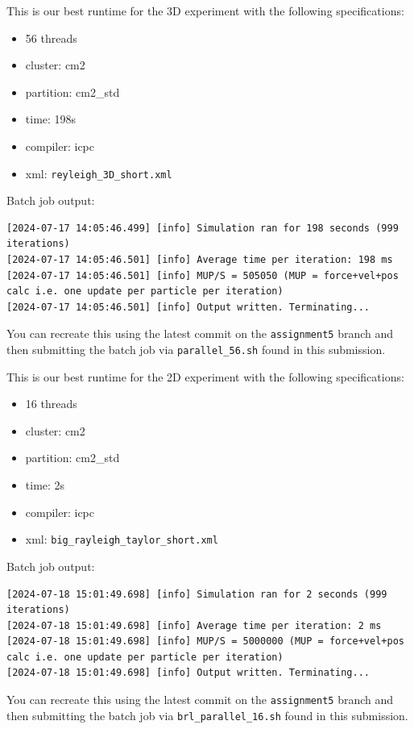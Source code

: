 \documentclass{article}
\begin{document}
\bigskip
This is our best runtime for the 3D experiment with the following specifications:

\begin{itemize}
    \item 56 threads 
    \item cluster: cm2
    \item partition: cm2\_std
    \item time: 198s
    \item compiler: icpc
    \item xml: \texttt{reyleigh\_3D\_short.xml}
\end{itemize}

Batch job output:
\begin{lstlisting}
[2024-07-17 14:05:46.499] [info] Simulation ran for 198 seconds (999 iterations)
[2024-07-17 14:05:46.501] [info] Average time per iteration: 198 ms
[2024-07-17 14:05:46.501] [info] MUP/S = 505050 (MUP = force+vel+pos calc i.e. one update per particle per iteration)
[2024-07-17 14:05:46.501] [info] Output written. Terminating...
\end{lstlisting}
You can recreate this using the latest commit on the \texttt{assignment5} branch and then submitting the batch job via \texttt{parallel\_56.sh} found in this submission.


\bigskip
This is our best runtime for the 2D experiment with the following specifications:

\begin{itemize}
    \item 16 threads 
    \item cluster: cm2
    \item partition: cm2\_std
    \item time: 2s 
    \item compiler: icpc
    \item xml: \texttt{big\_rayleigh\_taylor\_short.xml}
\end{itemize}

Batch job output:
\begin{lstlisting}
[2024-07-18 15:01:49.698] [info] Simulation ran for 2 seconds (999 iterations)
[2024-07-18 15:01:49.698] [info] Average time per iteration: 2 ms
[2024-07-18 15:01:49.698] [info] MUP/S = 5000000 (MUP = force+vel+pos calc i.e. one update per particle per iteration)
[2024-07-18 15:01:49.698] [info] Output written. Terminating...
\end{lstlisting}
You can recreate this using the latest commit on the \texttt{assignment5} branch and then submitting the batch job via \texttt{brl\_parallel\_16.sh} found in this submission.
\end{document}
